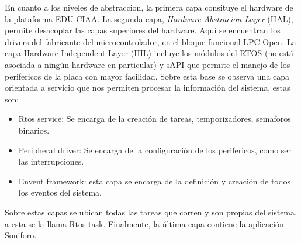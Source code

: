 En cuanto a los niveles de abstraccion, la primera capa consituye el hardware de la plataforma EDU-CIAA. La segunda capa, \textit{Hardware Abstracion Layer} (HAL), permite desacoplar las capas superiores del hardware. Aquí se encuentran los
drivers del fabricante del microcontrolador, en el bloque funcional LPC Open. La capa Hardware Independent Layer (HIL) incluye los módulos del RTOS (no está asociada a ningún hardware en particular) y sAPI que permite el manejo de los perifericos de la placa con mayor facilidad.
Sobre esta base se observa una capa orientada a servicio que nos permiten procesar la información del sistema, estas son: 
\begin{itemize}
\item Rtos service: Se encarga de la creación de tareas, temporizadores, semaforos binarios.
\item Peripheral driver: Se encarga de la configuración de los perifericos, como ser las interrupciones.
\item Envent framework: esta capa se encarga de la definición y creación de todos los eventos del sistema.
\end{itemize}

Sobre estas capas se ubican todas las tareas que corren y son propias del sistema, a esta se la llama Rtos task. Finalmente, la última capa contiene la aplicación Soniforo.



